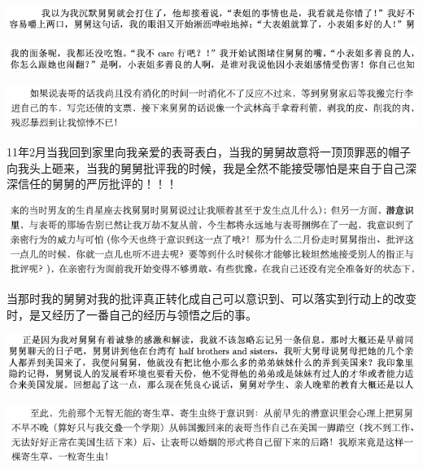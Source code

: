\documentclass[9pt, b5paper]{article}
\begin{document}
\begin{center}
\includegraphics[width=.9\linewidth]{./pic/backups_plans_20210512_100345.png}
\end{center}

\begin{center}
\includegraphics[width=.9\linewidth]{./pic/backups_plans_20210512_100319.png}
\end{center}

\begin{center}
\includegraphics[width=.9\linewidth]{./pic/backups_plans_20210512_100159.png}
\end{center}

11年2月当我回到家里向我亲爱的表哥表白，当我的舅舅故意将一顶顶罪恶的帽子向我头上砸来，当我的舅舅批评我的时候，我是全然不能接受哪怕是来自于自己深深信任的舅舅的严厉批评的！！！

\begin{center}
\includegraphics[width=.9\linewidth]{./pic/backups_plans_20210512_100728.png}
\end{center}

当那时我的舅舅对我的批评真正转化成自己可以意识到、可以落实到行动上的改变时，是又经历了一番自己的经历与领悟之后的事。 

\begin{center}
\includegraphics[width=.9\linewidth]{./pic/backups_plans_20210512_101244.png}
\end{center}

\begin{center}
\includegraphics[width=.9\linewidth]{./pic/backups_plans_20210512_101141.png}
\end{center}
\end{document}
